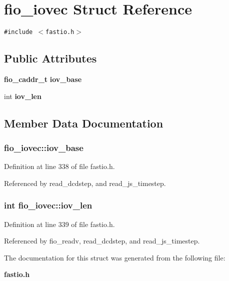 \section{fio\_\-iovec  Struct Reference}
\label{structfio__iovec}
{\tt \#include $<$fastio.h$>$}

\subsection*{Public Attributes}
\begin{CompactItemize}
\item 
{\bf fio\_\-caddr\_\-t} {\bf iov\_\-base}
\item 
int {\bf iov\_\-len}
\end{CompactItemize}


\subsection{Member Data Documentation}
\subsubsection{ fio\_\-iovec::iov\_\-base}\label{structfio__iovec_m0}




Definition at line 338 of file fastio.h.

Referenced by read\_\-dcdstep, and read\_\-js\_\-timestep.
\subsubsection{\setlength{\rightskip}{0pt plus 5cm}int fio\_\-iovec::iov\_\-len}\label{structfio__iovec_m1}




Definition at line 339 of file fastio.h.

Referenced by fio\_\-readv, read\_\-dcdstep, and read\_\-js\_\-timestep.

The documentation for this struct was generated from the following file:\begin{CompactItemize}
\item 
{\bf fastio.h}\end{CompactItemize}

